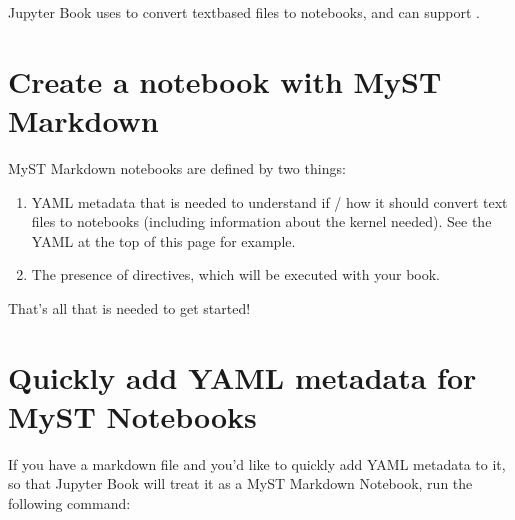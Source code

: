 \documentclass[letterpaper,10pt,english]{jupyterBook}
\begin{document}
\nopagebreak


\sphinxAtStartPar
Jupyter Book uses  to convert text\sphinxhyphen{}based files to notebooks, and can support .




\section{Create a notebook with MyST Markdown}
\label{\detokenize{markdown-notebooks:create-a-notebook-with-myst-markdown}}
\sphinxAtStartPar
MyST Markdown notebooks are defined by two things:
\begin{enumerate}
%
\item {} 
\sphinxAtStartPar
YAML metadata that is needed to understand if / how it should convert text files to notebooks (including information about the kernel needed).
See the YAML at the top of this page for example.

\item {} 
\sphinxAtStartPar
The presence of  directives, which will be executed with your book.

\end{enumerate}

\sphinxAtStartPar
That’s all that is needed to get started!


\section{Quickly add YAML metadata for MyST Notebooks}
\label{\detokenize{markdown-notebooks:quickly-add-yaml-metadata-for-myst-notebooks}}
\sphinxAtStartPar
If you have a markdown file and you’d like to quickly add YAML metadata to it, so that Jupyter Book will treat it as a MyST Markdown Notebook, run the following command:

\begin{sphinxVerbatim}[commandchars=\\\{\}]
   
\end{sphinxVerbatim}







\renewcommand{\indexname}{Index}
\printindex
\end{document}

